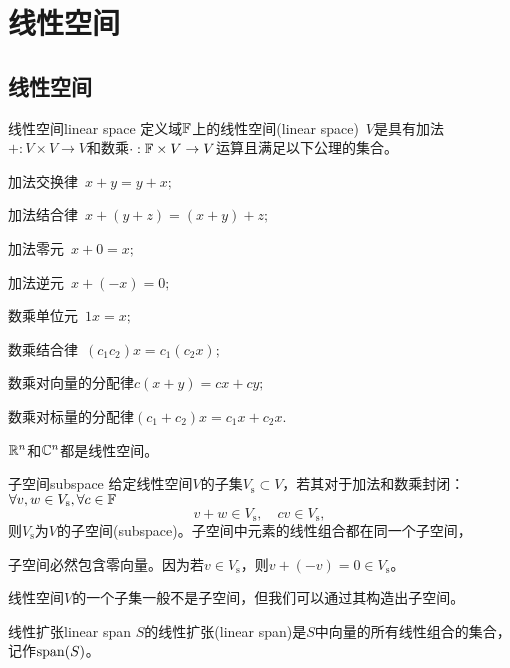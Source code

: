 \chapter{线性空间}
\section{线性空间}
\begin{definition}{线性空间}{linear space}
	定义域$\mathbb F$上的线性空间(linear space)~$V$是具有加法$+:V\times V\to V$和数乘$\cdot:\mathbb F\times V\to V$运算且满足以下公理的集合。
	\begin{compactenum}
		\item 加法交换律\qqqquad\quad~$x+y=y+x;$
		\item 加法结合律\qqqquad\quad~$x+(y+z)=(x+y)+z;$
		\item 加法零元\qqqquad\qquad~$x+0=x;$
		\item 加法逆元\qqqquad\qquad~$x+(-x)=0;$
		\item 数乘单位元\qqqquad\quad~$1x=x;$
		\item 数乘结合律\qqqquad\quad~$(c_1c_2)x=c_1(c_2x);$
		\item 数乘对向量的分配律\quad$c(x+y)=cx+cy;$
		\item 数乘对标量的分配律\quad$(c_1+c_2)x=c_1x+c_2x.$
	\end{compactenum}
\end{definition}

\begin{example}
	{}{}
	$\mathbb R^n$和$\mathbb C^n$都是线性空间。
\end{example}

\begin{definition}{子空间}{subspace}
	给定线性空间$V$的子集$V_\mathrm s\subset V$，若其对于加法和数乘封闭：$\forall v,w\in V_\mathrm s,\forall c\in\mathbb F$
	\[
		v+w\in V_\mathrm s,\quad cv\in V_\mathrm s,
	\]
	则$V_\mathrm s$为$V$的子空间(subspace)。子空间中元素的线性组合都在同一个子空间，
\end{definition}

\begin{corollary}
	子空间必然包含零向量。因为若$v\in V_\mathrm s$，则$v+(-v)=0\in V_\mathrm s$。
\end{corollary}

\begin{remark}
	线性空间$V$的一个子集一般不是子空间，但我们可以通过其构造出子空间。
\end{remark}

\begin{definition}{线性扩张}{linear span}
	$S$的线性扩张(linear span)是$S$中向量的所有线性组合的集合，记作$\operatorname{span}(S)$。
\end{definition}

